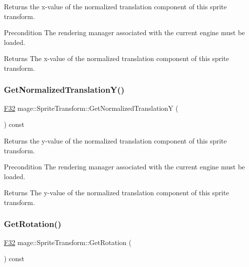 Returns the x-\/value of the normalized translation component of this sprite transform.

\begin{DoxyPrecond}{Precondition}
The rendering manager associated with the current engine must be loaded. 
\end{DoxyPrecond}
\begin{DoxyReturn}{Returns}
The x-\/value of the normalized translation component of this sprite transform. 
\end{DoxyReturn}
\hypertarget{structmage_1_1_sprite_transform_a6c5685c5d45391c6d5d820677b58c976}{}\label{structmage_1_1_sprite_transform_a6c5685c5d45391c6d5d820677b58c976} 
\subsubsection{\texorpdfstring{Get\+Normalized\+Translation\+Y()}{GetNormalizedTranslationY()}}
{\footnotesize\ttfamily \hyperlink{namespacemage_aa97e833b45f06d60a0a9c4fc22ae02c0}{F32} mage\+::\+Sprite\+Transform\+::\+Get\+Normalized\+TranslationY (\begin{DoxyParamCaption}{ }\end{DoxyParamCaption}) const}

Returns the y-\/value of the normalized translation component of this sprite transform.

\begin{DoxyPrecond}{Precondition}
The rendering manager associated with the current engine must be loaded. 
\end{DoxyPrecond}
\begin{DoxyReturn}{Returns}
The y-\/value of the normalized translation component of this sprite transform. 
\end{DoxyReturn}
\hypertarget{structmage_1_1_sprite_transform_ae7fc2e36ce99ea41a74d53032437dd58}{}\label{structmage_1_1_sprite_transform_ae7fc2e36ce99ea41a74d53032437dd58} 
\subsubsection{\texorpdfstring{Get\+Rotation()}{GetRotation()}}
{\footnotesize\ttfamily \hyperlink{namespacemage_aa97e833b45f06d60a0a9c4fc22ae02c0}{F32} mage\+::\+Sprite\+Transform\+::\+Get\+Rotation (\begin{DoxyParamCaption}{ }\end{DoxyParamCaption}) const\hspace{0.3cm}{\ttfamily [noexcept]}}

